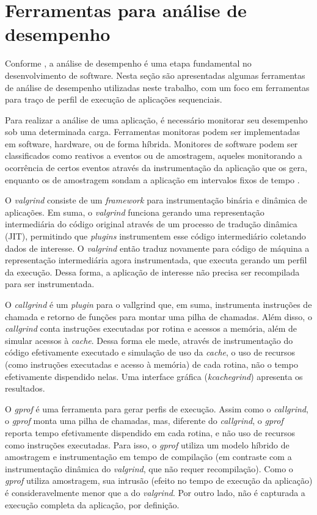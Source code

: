 \documentclass[cic,tc]{iiufrgs}
\begin{document}
\section{Ferramentas para análise de desempenho}
\label{sec:antanal}

Conforme \cite{jain2art}, a análise de desempenho é uma etapa fundamental no
desenvolvimento de software. Nesta seção são apresentadas algumas ferramentas
de análise de desempenho utilizadas neste trabalho, com um foco em ferramentas
para traço de perfil de execução de aplicações sequenciais.

Para realizar a análise de uma aplicação, é necessário monitorar seu desempenho
sob uma determinada carga. Ferramentas monitoras podem ser implementadas em
software, hardware, ou de forma híbrida. Monitores de software podem ser
classificados como reativos a eventos ou de amostragem, aqueles monitorando a
ocorrência de certos eventos através da instrumentação da aplicação que os
gera, enquanto os de amostragem sondam a aplicação em intervalos fixos de
tempo \cite{jain2art}.

O \textit{valgrind} \cite{nethercote2007valgrind} consiste de um \textit{framework} para
instrumentação binária e dinâmica de aplicações. Em suma, o \textit{valgrind} funciona
gerando uma representação intermediária do código original através de um
processo de tradução dinâmica (JIT), permitindo que \textit{plugins}
instrumentem esse código intermediário coletando dados de interesse. O \textit{valgrind}
então traduz novamente para código de máquina a representação intermediária
agora instrumentada, que executa gerando um perfil da execução. Dessa forma, a
aplicação de interesse não precisa ser recompilada para ser instrumentada.

O \textit{callgrind} \cite{weidendorfer2008sequential} é um \textit{plugin} para o
vallgrind que, em suma, instrumenta instruções de chamada e retorno de funções
para montar uma pilha de chamadas. Além disso, o \textit{callgrind} conta instruções
executadas por rotina e acessos a memória, além de simular acessos à \textit{cache}.
Dessa forma ele mede, através de instrumentação do código efetivamente
executado e simulação de uso da \textit{cache}, o uso de recursos (como instruções
executadas e acesso à memória) de cada rotina, não o tempo efetivamente
dispendido nelas. Uma interface gráfica (\textit{kcachegrind}) apresenta os resultados.

O \textit{gprof} \cite{graham1982gprof} é uma ferramenta para gerar perfis de execução.
Assim como o \textit{callgrind}, o \textit{gprof} monta uma pilha de chamadas, mas, diferente do
\textit{callgrind}, o \textit{gprof} reporta tempo efetivamente dispendido em cada rotina, e não
uso de recursos como instruções executadas. Para isso, o \textit{gprof} utiliza um
modelo híbrido de amostragem e instrumentação em tempo de compilação (em
contraste com a instrumentação dinâmica do \textit{valgrind}, que não requer
recompilação). Como o \textit{gprof} utiliza amostragem, sua intrusão (efeito no tempo
de execução da aplicação) é consideravelmente menor que a do \textit{valgrind}. Por
outro lado, não é capturada a execução completa da aplicação, por definição.
\end{document}
